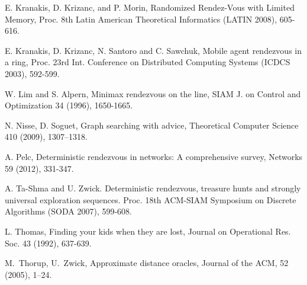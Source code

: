 \documentclass{llncs}
\begin{document}
\begin{thebibliography}{12}
E. Kranakis, D. Krizanc, and P. Morin, 
Randomized Rendez-Vous with Limited Memory,
Proc. 8th Latin American Theoretical Informatics (LATIN 2008), 605-616.

E. Kranakis, D. Krizanc, N. Santoro and C. Sawchuk, 
Mobile agent rendezvous in a ring, 
Proc. 23rd Int. Conference on Distributed Computing Systems
(ICDCS 2003), 592-599.

W. Lim and S. Alpern,
Minimax rendezvous on the line,
SIAM J. on Control and Optimization 34 (1996), 1650-1665.



N. Nisse, D. Soguet, Graph searching with advice,
Theoretical Computer Science 410 (2009), 1307--1318.



A. Pelc, Deterministic rendezvous in networks: A comprehensive survey, 
Networks 59 (2012), 331-347. 




A. Ta-Shma and U. Zwick.
Deterministic rendezvous, treasure hunts and strongly universal exploration sequences.
Proc. 18th ACM-SIAM Symposium on Discrete Algorithms (SODA 2007), 599-608.

L. Thomas,
Finding your kids when they are lost,
Journal on Operational Res. Soc. 43 (1992), 637-639.

M.~Thorup, U.~Zwick, Approximate distance oracles,
Journal of the ACM, 52 (2005), 1--24.







\end{thebibliography}
\end{document}
